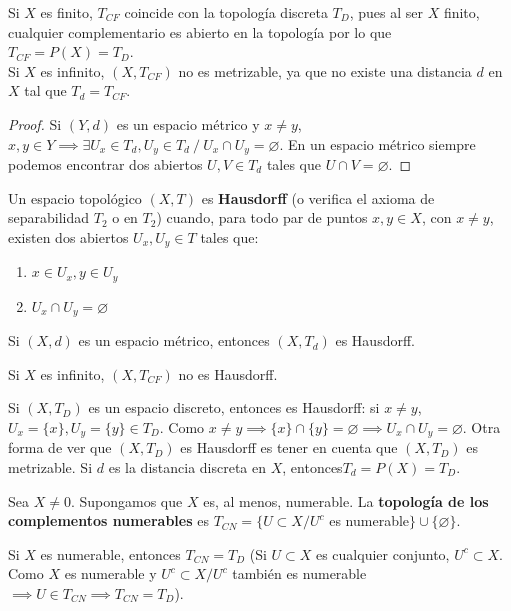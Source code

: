 Si $X$ es finito, $T_{CF}$ coincide con la topología discreta $T_D$, pues al ser $X$ finito, cualquier complementario es abierto en la topología por lo que $T_{CF} = P(X) = T_D$. \\

Si $X$ es infinito, $(X,T_{CF})$ no es metrizable, ya que no existe una distancia $d$ en $X$ tal que $T_d=T_{CF}$.
\begin{proof}
  Si $(Y,d)$ es un espacio métrico y $x \neq y$, $x,y \in Y \implies \exists U_x \in T_d, U_y \in T_d\ /\ U_x \cap U_y = \varnothing $. En un espacio métrico siempre podemos encontrar dos abiertos $U,V \in T_d$ tales que $U \cap V = \varnothing $.
\end{proof}

\begin{ndef}
  Un espacio topológico $(X,T)$ es \textbf{Hausdorff} (o verifica el axioma de separabilidad $T_2$ o en $T_2$) cuando, para todo par de puntos $x,y \in X$, con $x \neq y$, existen dos abiertos $U_x,U_y \in T$ tales que:
  \begin{enumerate}
    \item $x \in U_x, y \in U_y$
    \item $U_x \cap U_y = \varnothing $
  \end{enumerate}
\end{ndef}

\begin{exmp}
  Si $(X,d)$ es un espacio métrico, entonces $(X,T_d)$ es Hausdorff.
\end{exmp}
\begin{exmp}
  Si $X$ es infinito, $(X,T_{CF})$ no es Hausdorff.
\end{exmp}
\begin{exmp}
  Si $(X,T_D)$ es un espacio discreto, entonces es Hausdorff: si $x \neq y$, $U_x=\{x\}, U_y=\{y\} \in T_D$. Como $x \neq y \implies \{x\} \cap \{y\} = \varnothing \implies U_x \cap U_y = \varnothing $.
  Otra forma de ver que $(X,T_D)$ es Hausdorff es tener en cuenta que $(X,T_D)$ es metrizable. Si $d$ es la distancia discreta en $X$, entonces$T_d=P(X)=T_D$.
\end{exmp}

\begin{exmp}
  Sea $X \neq 0$. Supongamos que $X$ es, al menos, numerable. La \textbf{topología de los complementos numerables} es $T_{CN}=\{U \subset X / U^c$ es numerable$\} \cup \{\varnothing \}$.
\end{exmp}
Si $X$ es numerable, entonces $T_{CN}=T_D$ (Si $U \subset  X$ es cualquier conjunto, $U^c \subset X$. Como $X$ es numerable y $U^c \subset X / U^c$ también es numerable $\implies U \in T_{CN} \implies T_{CN} = T_D$).

